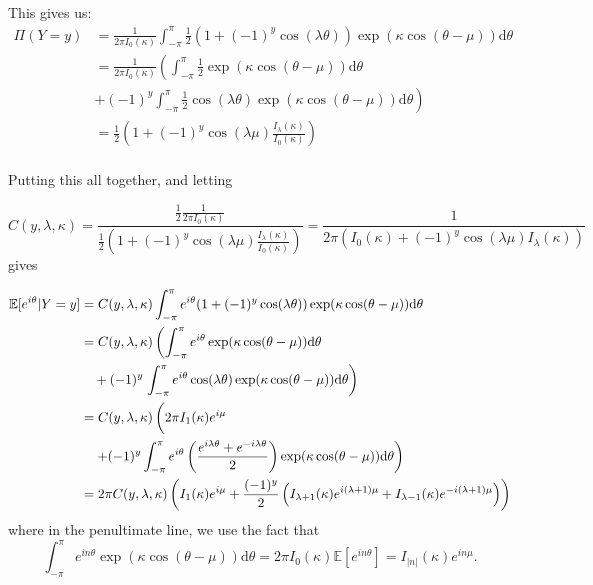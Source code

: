 \documentclass[]{report}
\begin{document}
This gives us:
\begin{align*}
	\Pi(Y = y) &= \frac{1}{2 \pi I_0(\kappa)} \int_{- \pi}^{\pi} \frac{1}{2} (1 + (-1)^y \cos(\lambda \theta)) \exp(\kappa \cos(\theta - \mu)) \text{d} \theta \\
	&= \frac{1}{2 \pi I_0(\kappa)} \left( \int_{- \pi}^{\pi} \frac{1}{2} \exp(\kappa \cos(\theta - \mu)) \text{d} \theta \right. \\
	 &\left. + (-1)^y \int_{- \pi}^{\pi} \frac{1}{2} \cos(\lambda \theta) \exp(\kappa \cos(\theta - \mu)) \text{d} \theta  \right) \\
	&= \frac{1}{2}\left(1 + (-1)^y \cos(\lambda \mu) \frac{I_\lambda(\kappa)}{I_0(\kappa)}\right)  \\
\end{align*}

Putting this all together, and letting

\[
C(y, \lambda, \kappa) = \frac{\frac{1}{2} \frac{1}{2 \pi I_0(\kappa)}}{\frac{1}{2} (1 + (-1)^y \cos(\lambda \mu) \frac{I_\lambda(\kappa)}{I_0(\kappa)} )} = \frac{1}{ 2 \pi(I_0(\kappa) + (-1)^y \cos(\lambda \mu) I_\lambda(\kappa))}
\]
gives

\begin{align*}
	\mathbb{E}[e^{i \theta} | Y = y] &= C(y, \lambda, \kappa) \int_{- \pi}^{\pi} e^{i \theta} (1 + (-1)^y \cos(\lambda \theta)) \exp(\kappa \cos(\theta - \mu)) \text{d} \theta \\
& =	C(y, \lambda, \kappa) \left(  \int_{- \pi}^{\pi} e^{i \theta} \exp(\kappa \cos(\theta - \mu)) \text{d} \theta \right. \\
 & \quad + (-1)^y  \left. \int_{- \pi}^{\pi} e^{i \theta} \cos(\lambda \theta)   \exp(\kappa \cos(\theta - \mu)) \text{d} \theta \right)\\
 &= C(y, \lambda, \kappa) \left( \vphantom{\int_{-\pi}^\pi} 2 \pi I_1(\kappa) e^{i \mu} \right. \\
 &\quad \left.+ (-1)^y  \int_{-\pi}^{\pi} e^{i \theta} \left( \frac{e^{i \lambda \theta} + e^{- i \lambda \theta}}{2}\right)  \exp(\kappa \cos(\theta - \mu)) \text{d} \theta \right) \\
 &= 2 \pi C(y, \lambda, \kappa) \left( I_1(\kappa) e^{i \mu} + \frac{(-1)^y}{2} \left(I_{\lambda + 1}(\kappa)e^{i(\lambda + 1) \mu}  + I_{\lambda - 1}(\kappa) e^{-i(\lambda + 1)\mu}\right) \right)
\end{align*}
where in the penultimate line, we use the fact that
\[
\int_{- \pi}^ \pi e^{i n \theta} \exp(\kappa \cos(\theta - \mu)) \text{d} \theta = 2 \pi I_0(\kappa) \mathbb{E}[e^{i n \theta}] = I_{|n|}(\kappa) e^{i n \mu}.
\]
\end{document}

